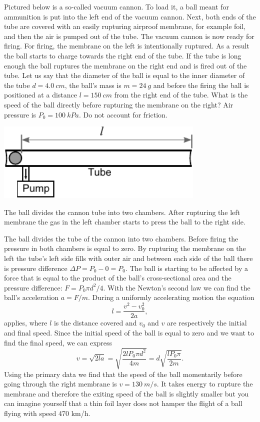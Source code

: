 Pictured below is a so-called vacuum cannon. To load it, a ball meant for ammunition is put into the left end of the vacuum cannon. Next, both ends of the tube are covered with an easily rupturing airproof membrane, for example foil, and then the air is pumped out of the tube. The vacuum cannon is now ready for firing. For firing, the membrane on the left is intentionally ruptured. As a result the ball starts to charge towards the right end of the tube. If the tube is long enough the ball ruptures the membrane on the right end and is fired out of the tube. Let us say that the diameter of the ball is equal to the inner diameter of the tube $d=\SI{4,0}{cm}$, the ball’s mass is $m=\SI{24}{g}$ and before the firing the ball is positioned at a distance $l=\SI{150}{cm}$ from the right end of the tube. What is the speed of the ball directly before rupturing the membrane on the right? Air pressure is $P_0=\SI{100}{kPa}$. Do not account for friction.
\begin{center}
  \includegraphics[width=0.75\textwidth]{2014-lahg-02-vaakumkahur_ing}
\end{center}

\hinteng
The ball divides the cannon tube into two chambers. After rupturing the left membrane the gas in the left chamber starts to press the ball to the right side.

\solueng
The ball divides the tube of the cannon into two chambers. Before firing the pressure in both chambers is equal to zero. By rupturing the membrane on the left the tube’s left side fills with outer air and between each side of the ball there is pressure difference $\Delta P=P_0-0=P_0$. The ball is starting to be affected by a force that is equal to the product of the ball’s cross-sectional area and the pressure difference: $F=P_0\pi d^2/4$. With the Newton’s second law we can find the ball’s acceleration $a=F/m$. During a uniformly accelerating motion the equation 
\[ l=\frac{v^2-v_0^2}{2a}, \] 
applies, where $l$ is the distance covered and $v_0$ and $v$ are respectively the initial and final speed. Since the initial speed of the ball is equal to zero and we want to find the final speed, we can express 
\[ v=\sqrt{2la}=\sqrt{\frac{2lP_0\pi d^2}{4m}}=d\sqrt{\frac{lP_0\pi}{2m}}.\] 
Using the primary data we find that the speed of the ball momentarily before going through the right membrane is $v=\SI{130}{m/s}$. It takes energy to rupture the membrane and therefore the exiting speed of the ball is slightly smaller but you can imagine yourself that a thin foil layer does not hamper the flight of a ball flying with speed 470 km/h.
\probend